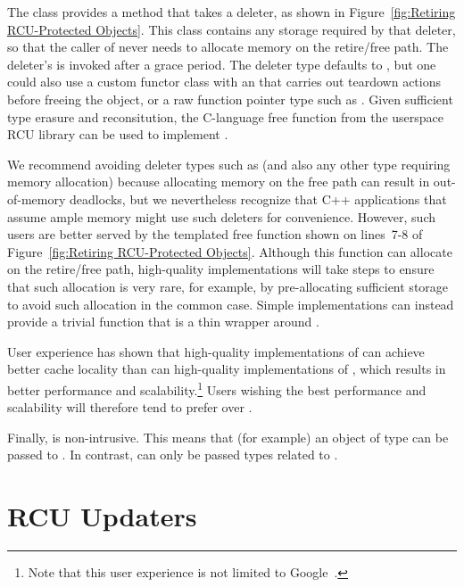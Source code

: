 \documentclass[letterpaper,10pt]{article}
\begin{document}
The  class provides a  method that
takes a deleter,
as shown in
Figure~\ref{fig:Retiring RCU-Protected Objects}.
This class contains any storage required by that deleter, so that
the caller of
 never needs to allocate
memory on the retire/free path.
The deleter's  is invoked after a grace period.
The deleter type defaults to ,
but one could also use a
custom functor class with an  that carries out teardown actions
before freeing the object, or a raw function pointer type such as
.
Given sufficient type erasure and reconsitution, the 
C-language free function from the userspace RCU library can be used to
implement .

We recommend avoiding deleter types such as 
(and also any other type requiring memory allocation) because
allocating memory on the free path can result in out-of-memory deadlocks,
but we nevertheless recognize that C++ applications that assume ample
memory might use such deleters for convenience.
However, such users are better served by the 
templated free function shown on lines~7-8 of
Figure~\ref{fig:Retiring RCU-Protected Objects}.
Although this function can allocate on the retire/free path, high-quality
implementations will take steps to ensure that such allocation is very
rare, for example, by pre-allocating sufficient storage to avoid
such allocation in the common case.
Simple implementations can instead provide a trivial 
function that is a thin wrapper around .

User experience has shown that high-quality implementations
of  can achieve better cache locality than can 
high-quality implementations of ,
which results in better performance and
scalability.\footnote{
	Note that this user experience is not limited to
	Google~\cite{MathieuDesnoyers2012URCU}.}
Users wishing the best performance and scalability will therefore tend
to prefer  over .

Finally,  is non-intrusive.
This means that (for example) an object of type  can be
passed to .
In contrast,  can only be passed types
related to .

\section{RCU Updaters}
\label{sec:RCU Updaters}
\end{document}
